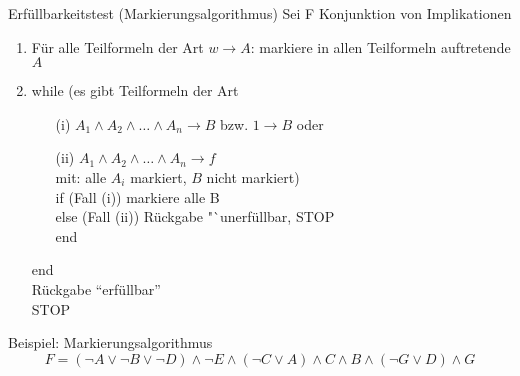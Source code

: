 \begin{frame}{Erfüllbarkeitstest (Markierungsalgorithmus)}
	Sei F Konjunktion von Implikationen
	\begin{enumerate}
		\item Für alle Teilformeln der Art $w \rightarrow A$: markiere in allen Teilformeln auftretende $A$
		\item while (es gibt Teilformeln der Art
		\begin{enumerate}
			\item[(i)] $A_1 \land A_2 \land \ldots \land A_n \rightarrow B$ bzw. $1 \rightarrow B$ oder
			\item[(ii)] $A_1 \land A_2 \land \ldots \land A_n \rightarrow f$\\
			mit: alle $A_i$ markiert, $B$ nicht markiert)\\
			if (Fall (i)) markiere alle B\\
			else (Fall (ii)) Rückgabe "`unerfüllbar, STOP\\
			end
		\end{enumerate}
		end\\
		Rückgabe "`erfüllbar"'\\
		STOP
	\end{enumerate}
\end{frame}

\begin{frame}{Beispiel: Markierungsalgorithmus}
	$$F=(\neg A \lor \neg B \lor \neg D) \land \neg E \land (\neg C \lor A) \land C \land B \land (\neg G \lor D) \land G$$
\end{frame}

